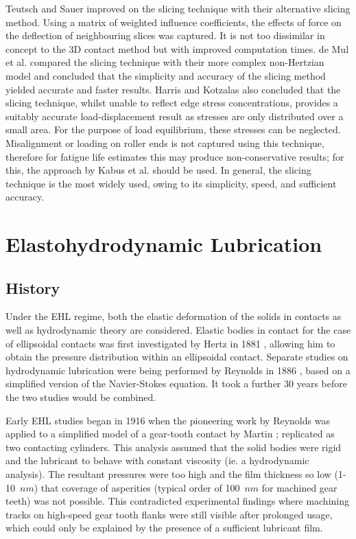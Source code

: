 Teutsch and Sauer \cite{Teutsch2004} improved on the slicing technique with their alternative slicing method. Using a matrix of weighted influence coefficients, the effects of force on the deflection of neighbouring slices was captured. It is not too dissimilar in concept to the 3D contact method but with improved computation times. de Mul et al. \cite{DeMul1989_2} compared the slicing technique with their more complex non-Hertzian model and concluded that the simplicity and accuracy of the slicing method yielded accurate and faster results. Harris and Kotzalas \cite{Harris2007} also concluded that the slicing technique, whilst unable to reflect edge stress concentrations, provides a suitably accurate load-displacement result as stresses are only distributed over a small area. For the purpose of load equilibrium, these stresses can be neglected. Misalignment or loading on roller ends is not captured using this technique, therefore for fatigue life estimates this may produce non-conservative results; for this, the approach by Kabus et al. should be used. In general, the slicing technique is the most widely used, owing to its simplicity, speed, and sufficient accuracy.

\section{Elastohydrodynamic Lubrication}

\subsection{History}

Under the EHL regime, both the elastic deformation of the solids in contacts as well as hydrodynamic theory are considered. Elastic bodies in contact for the case of ellipsoidal contacts was first investigated by Hertz in 1881 \cite{Hertz1881}, allowing him to obtain the pressure distribution within an ellipsoidal contact. Separate studies on hydrodynamic lubrication were being performed by Reynolds in 1886 \cite{Reynolds1886}, based on a simplified version of the Navier-Stokes equation. It took a further 30 years before the two studies would be combined.

Early EHL studies began in 1916 when the pioneering work by Reynolds was applied to a simplified model of a gear-tooth contact by Martin \cite{Martin1916}; replicated as two contacting cylinders. This analysis assumed that the solid bodies were rigid and the lubricant to behave with constant viscosity (ie. a hydrodynamic analysis). The resultant pressures were too high and the film thickness so low (1-10~$nm$) that coverage of asperities (typical order of 100~$nm$ for machined gear teeth) was not possible. This contradicted experimental findings where machining tracks on high-speed gear tooth flanks were still visible after prolonged usage, which could only be explained by the presence of a sufficient lubricant film.


